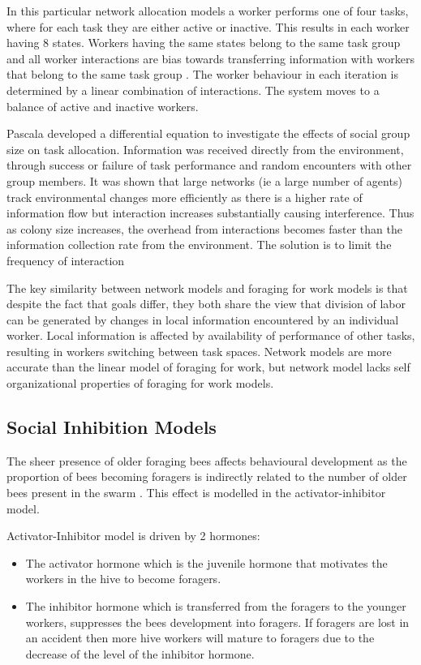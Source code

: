 In this particular network allocation models a worker performs one of four tasks, where for each task they are either active or inactive. This results in each worker having 8 states. Workers having the same states belong to the same task group and all worker interactions are bias towards transferring information with workers that belong to the same task group \cite{gordon1992parallel}. The worker behaviour in each iteration is determined by a linear combination of interactions. The system moves to a balance of active and inactive workers. 

Pascala \cite{pacala1996effects} developed a differential equation to investigate the effects of social group size on task allocation. Information was received directly from the environment, through success or failure of task performance and random encounters with other group members. It was shown that large networks (ie a large number of agents) track environmental changes more efficiently as there is a higher rate of information flow but interaction increases substantially causing interference. Thus as colony size increases, the overhead from interactions becomes faster than the information collection rate from the environment. The solution is to limit the frequency of interaction \cite{pacala1996effects}

The key similarity between network models and foraging for work models is that despite the fact that goals differ, they both share the view that division of labor can be generated by changes in local information encountered by an individual worker. Local information is affected by availability of performance of other tasks, resulting in workers switching between task spaces. Network models are more accurate than the linear model of foraging for work, but network model lacks self organizational properties of foraging for work models.

\subsection{Social Inhibition Models}

The sheer presence of older foraging bees affects behavioural development as the proportion of bees becoming foragers is indirectly related to the number of older bees present in the swarm . This effect is modelled in the activator-inhibitor model.

Activator-Inhibitor model is driven by 2 hormones:
\begin{itemize}
	\item The activator hormone which is the juvenile hormone that motivates the workers in the hive to become foragers.
	\item The inhibitor hormone which is transferred from the foragers to the younger workers, suppresses the bees development into foragers. If foragers are lost in an accident then more hive workers will mature to foragers due to the decrease of the level of the inhibitor hormone.
\end{itemize}

